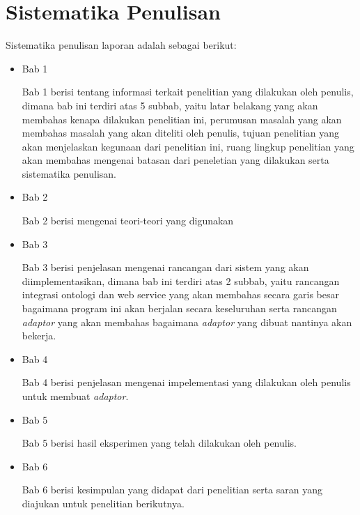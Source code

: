 \section{Sistematika Penulisan}
Sistematika penulisan laporan adalah sebagai berikut:
\begin{itemize}
	\item Bab 1 \babSatu
	
	Bab 1 berisi tentang informasi terkait penelitian yang dilakukan oleh penulis, dimana bab ini terdiri atas 5 subbab, yaitu latar belakang yang akan membahas kenapa dilakukan penelitian ini, perumusan masalah yang akan membahas masalah yang akan diteliti oleh penulis, tujuan penelitian yang akan menjelaskan kegunaan dari penelitian ini, ruang lingkup penelitian yang akan membahas mengenai batasan dari peneletian yang dilakukan serta sistematika penulisan.\\
	\item Bab 2 \babDua
	
	Bab 2 berisi mengenai teori-teori yang digunakan\\
	\item Bab 3 \babTiga 
	
	Bab 3 berisi penjelasan mengenai rancangan dari sistem yang akan diimplementasikan, dimana bab ini terdiri atas 2 subbab, yaitu rancangan integrasi ontologi dan web service yang akan membahas secara garis besar bagaimana program ini akan berjalan secara keseluruhan serta rancangan \textit{adaptor} yang akan membahas bagaimana \textit{adaptor} yang dibuat nantinya akan bekerja.\\
	
	\item Bab 4 \babEmpat
	
	Bab 4 berisi penjelasan mengenai impelementasi yang dilakukan oleh penulis untuk membuat \textit{adaptor}. \\
	
	\item Bab 5 \babLima
	
	
	Bab 5 berisi hasil eksperimen yang telah dilakukan oleh penulis. \\
	\item Bab 6 \babEnam
	
	Bab 6 berisi kesimpulan yang didapat dari penelitian serta saran yang diajukan untuk penelitian berikutnya.
\end{itemize}